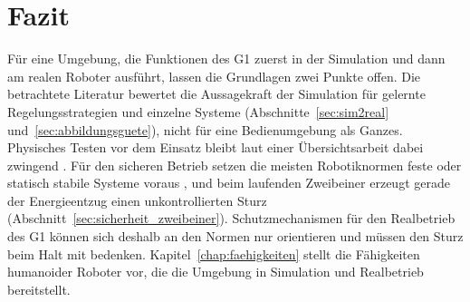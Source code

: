 \section{Fazit}
\label{sec:fazit_simulation}
Für eine Umgebung, die Funktionen des G1 zuerst in der Simulation und dann am realen Roboter ausführt, lassen die Grundlagen zwei Punkte offen.
Die betrachtete Literatur bewertet die Aussagekraft der Simulation für gelernte Regelungsstrategien und einzelne Systeme (Abschnitte~\ref{sec:sim2real} und~\ref{sec:abbildungsguete}), nicht für eine Bedienumgebung als Ganzes.
Physisches Testen vor dem Einsatz bleibt laut einer Übersichtsarbeit dabei zwingend \cite{Choi2021}.
Für den sicheren Betrieb setzen die meisten Robotiknormen feste oder statisch stabile Systeme voraus \cite{Prather2025}, und beim laufenden Zweibeiner erzeugt gerade der Energieentzug einen unkontrollierten Sturz \cite{Ding2026} (Abschnitt~\ref{sec:sicherheit_zweibeiner}).
Schutzmechanismen für den Realbetrieb des G1 können sich deshalb an den Normen nur orientieren und müssen den Sturz beim Halt mit bedenken.
Kapitel~\ref{chap:faehigkeiten} stellt die Fähigkeiten humanoider Roboter vor, die die Umgebung in Simulation und Realbetrieb bereitstellt.
